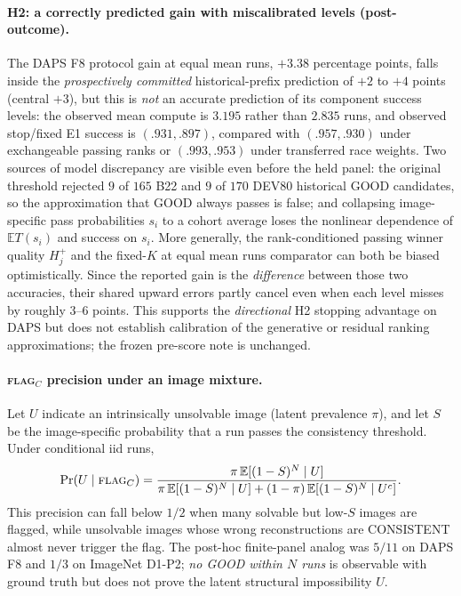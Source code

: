 \paragraph{H2: a correctly predicted gain with miscalibrated levels (post-outcome).}
The DAPS F8 protocol gain at equal mean runs, $+3.38$ percentage points,
falls inside the \emph{prospectively committed} historical-prefix
prediction of $+2$ to $+4$ points (central $+3$), but this is
\emph{not} an accurate prediction of its component success levels:
the observed mean compute is $3.195$ rather than $2.835$ runs,
and observed stop/fixed E1 success is $(.931,.897)$, compared
with $(.957,.930)$ under exchangeable passing ranks or
$(.993,.953)$ under transferred race weights. Two sources of
model discrepancy are visible even before the held panel:
the original threshold rejected $9$ of $165$ B22 and $9$ of
$170$ DEV80 historical GOOD candidates, so the approximation
that GOOD always passes is false; and collapsing image-specific
pass probabilities $s_i$ to a cohort average loses the nonlinear
dependence of $\mathbb E T(s_i)$ and success on $s_i$.
More generally, the rank-conditioned passing winner quality
$H_j^+$ and the fixed-$K$ at equal mean runs comparator can both
be biased optimistically. Since the reported gain is the
\emph{difference} between those two accuracies, their
shared upward errors partly cancel even when each level
misses by roughly $3$--$6$ points. This supports the
\emph{directional} H2 stopping advantage on DAPS but
does not establish calibration of the generative or residual
ranking approximations; the frozen pre-score note is unchanged.

\paragraph{\textsc{flag}$_C$ precision under an image mixture.}
Let $U$ indicate an intrinsically unsolvable image (latent prevalence
$\pi$), and let $S$ be the image-specific probability that a run
passes the consistency threshold. Under conditional iid runs,
\begin{equation}\label{eq:protocol-flag-precision}
 \Pr(U\mid\textsc{flag}_C)
 =\frac{\pi\,\mathbb E[(1-S)^N\mid U]}
 {\pi\,\mathbb E[(1-S)^N\mid U]
 +(1-\pi)\,\mathbb E[(1-S)^N\mid U^c]}.
\end{equation}
This precision can fall below $1/2$ when many solvable but low-$S$
images are flagged, while unsolvable images whose wrong reconstructions
are CONSISTENT almost never trigger the flag.
The post-hoc finite-panel analog was $5/11$ on DAPS F8 and $1/3$
on ImageNet D1-P2; \emph{no GOOD within $N$ runs} is observable with
ground truth but does not prove the latent structural impossibility $U$.

